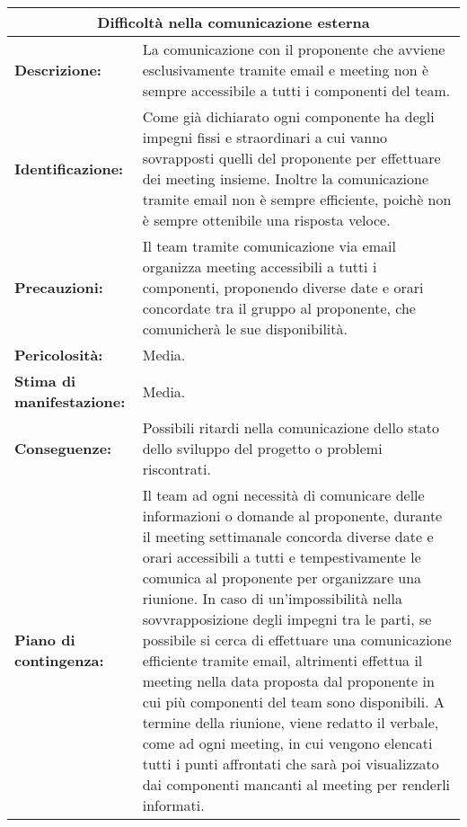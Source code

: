 \begin{tabular}{ |p{4cm}|p{10cm}|}
\hline
\multicolumn{2}{|c|}{\textbf{Difficoltà nella comunicazione esterna}} \\
\hline
\textbf{Descrizione:}& La comunicazione con il proponente che avviene esclusivamente tramite email e meeting non è sempre accessibile a tutti i componenti del team.\\
\hline
\textbf{Identificazione:}& Come già dichiarato ogni componente ha degli impegni fissi e straordinari a cui vanno sovrapposti quelli del proponente per effettuare dei meeting insieme. Inoltre la comunicazione tramite email non è sempre efficiente, poichè non è sempre ottenibile una risposta veloce.\\
\hline
\textbf{Precauzioni:}& Il team tramite comunicazione via email organizza meeting accessibili a tutti i componenti, proponendo diverse date e orari concordate tra il gruppo al proponente, che comunicherà le sue disponibilità.\\
\hline
\textbf{Pericolosità:}& Media.\\
\hline
\textbf{Stima di manifestazione:}& Media.\\
\hline
\textbf{Conseguenze:}& Possibili ritardi nella comunicazione dello stato dello sviluppo del progetto o problemi riscontrati.\\
\hline
\textbf{Piano di contingenza:}& Il team ad ogni necessità di comunicare delle informazioni o domande al proponente, durante il meeting settimanale concorda diverse date e orari accessibili a tutti e tempestivamente le comunica al proponente per organizzare una riunione. In caso di un'impossibilità nella sovvrapposizione degli impegni tra le parti, se possibile si cerca di effettuare una comunicazione efficiente tramite email, altrimenti effettua il meeting nella data proposta dal proponente in cui più componenti del team sono disponibili. A termine della riunione, viene redatto il verbale, come ad ogni meeting, in cui vengono elencati tutti i punti affrontati che sarà poi visualizzato dai componenti mancanti al meeting per renderli informati.\\
\hline
\end{tabular}

\vspace{20pt}


